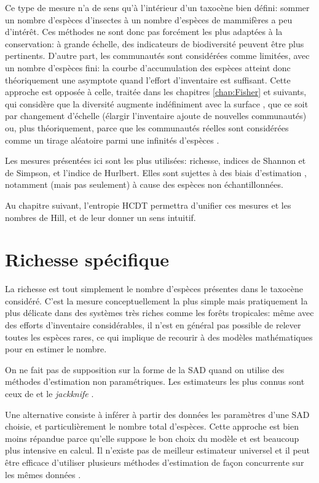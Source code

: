 \documentclass[
  11pt,
  french,
  a4paper,
  extrafontsizes,onecolumn,openright
  ]{memoir}
\newlength{\rf}
\begin{document}
Ce type de mesure n'a de sens qu'à l'intérieur d'un taxocène bien défini: sommer un nombre d'espèces d'insectes à un nombre d'espèces de mammifères a peu d'intérêt.
Ces méthodes ne sont donc pas forcément les plus adaptées à la conservation: à grande échelle, des indicateurs de biodiversité \autocite{Balmford2003} peuvent être plus pertinents.
D'autre part, les communautés sont considérées comme limitées, avec un nombre d'espèces fini: la courbe d'accumulation des espèces atteint donc théoriquement une asymptote quand l'effort d'inventaire est suffisant.
Cette approche est opposée à celle, traitée dans les chapitres \ref{chap:Fisher} et suivants, qui considère que la diversité augmente indéfiniment avec la surface \autocite{Williamson2001}, que ce soit par changement d'échelle (élargir l'inventaire ajoute de nouvelles communautés) ou, plus théoriquement, parce que les communautés réelles sont considérées comme un tirage aléatoire parmi une infinités d'espèces \autocite{Fisher1943}.

Les mesures présentées ici sont les plus utilisées: richesse, indices de Shannon et de Simpson, et l'indice de Hurlbert.
Elles sont sujettes à des biais d'estimation \autocite{Mouillot1999}, notamment (mais pas seulement) à cause des espèces non échantillonnées.

Au chapitre suivant, l'entropie HCDT permettra d'unifier ces mesures et les nombres de Hill, et de leur donner un sens intuitif.

\hypertarget{sec:Richesse}{%
\section{Richesse spécifique}\label{sec:Richesse}}

La richesse est tout simplement le nombre d'espèces présentes dans le taxocène considéré.
C'est la mesure conceptuellement la plus simple mais pratiquement la plus délicate dans des systèmes très riches comme les forêts tropicales: même avec des efforts d'inventaire considérables, il n'est en général pas possible de relever toutes les espèces rares, ce qui implique de recourir à des modèles mathématiques pour en estimer le nombre.

On ne fait pas de supposition sur la forme de la SAD quand on utilise des méthodes d'estimation non paramétriques.
Les estimateurs les plus connus sont ceux de \textcite{Chao1984} et le \emph{jackknife} \autocite{Burnham1979}.

Une alternative consiste à inférer à partir des données les paramètres d'une SAD choisie, et particulièrement le nombre total d'espèces.
Cette approche est bien moins répandue parce qu'elle suppose le bon choix du modèle et est beaucoup plus intensive en calcul.
Il n'existe pas de meilleur estimateur universel \autocite{OHara2005} et il peut être efficace d'utiliser plusieurs méthodes d'estimation de façon concurrente sur les mêmes données \autocite{Basset2012}.
\end{document}
